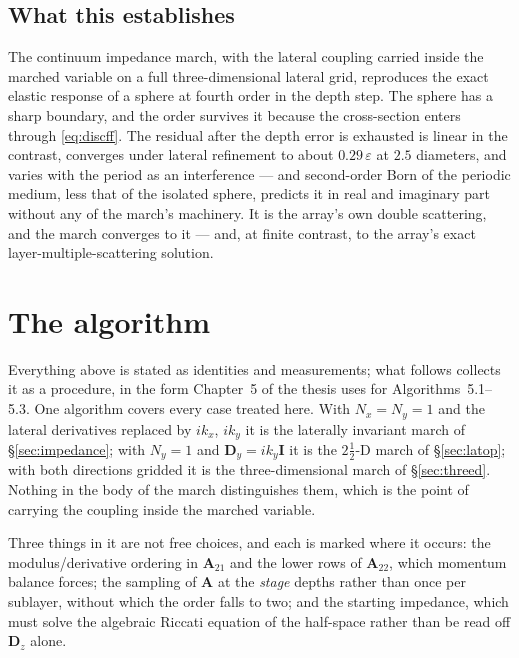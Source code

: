 \documentclass[11pt,a4paper]{article}
\newcommand{\bI}{\mathbf{I}}
\newcommand{\bA}{\mathbf{A}}
\begin{document}
\subsection{What this establishes}

The continuum impedance march, with the lateral coupling carried inside the
marched variable on a full three-dimensional lateral grid, reproduces the exact
elastic response of a sphere at fourth order in the depth step.  The sphere has
a sharp boundary, and the order survives it because the cross-section enters
through \eqref{eq:discff}.  The residual after the depth error is exhausted is
linear in the contrast, converges under lateral refinement to about
$0.29\,\varepsilon$ at $2.5$ diameters, and varies with the period as an
interference --- and second-order Born of the periodic medium, less that of the
isolated sphere, predicts it in real and imaginary part without any of the
march's machinery.  It is the array's own double scattering, and the march
converges to it --- and, at finite contrast, to the array's exact
layer-multiple-scattering solution.

\section{The algorithm}\label{sec:algorithm}

Everything above is stated as identities and measurements; what follows collects
it as a procedure, in the form Chapter~5 of the thesis uses for
Algorithms~5.1--5.3.  One algorithm covers every case treated here.  With
$N_x=N_y=1$ and the lateral derivatives replaced by $ik_x$, $ik_y$ it is the
laterally invariant march of \S\ref{sec:impedance}; with $N_y=1$ and
$\mathbf{D}_y = ik_y\bI$ it is the $2\tfrac12$-D march of \S\ref{sec:latop};
with both directions gridded it is the three-dimensional march of
\S\ref{sec:threed}.  Nothing in the body of the march distinguishes them, which
is the point of carrying the coupling inside the marched variable.

Three things in it are not free choices, and each is marked where it occurs:
the modulus/derivative ordering in $\bA_{21}$ and the lower rows of $\bA_{22}$,
which momentum balance forces; the sampling of $\bA$ at the \emph{stage} depths
rather than once per sublayer, without which the order falls to two; and the
starting impedance, which must solve the algebraic Riccati equation of the
half-space rather than be read off $\mathbf{D}_z$ alone.
\end{document}
